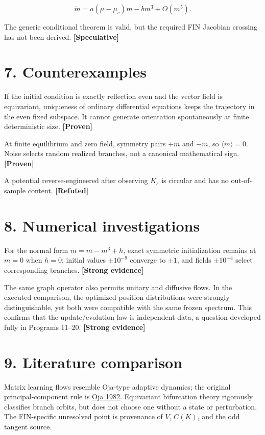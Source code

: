 \documentclass[11pt,a4paper,openany]{report}
\newcommand{\statusProven}{\textcolor{fingreen}{[Proven]}}
\newcommand{\statusStrong}{\textcolor{finblue}{[Strong evidence]}}
\newcommand{\statusSpeculative}{\textcolor{finorange}{[Speculative]}}
\newcommand{\statusRefuted}{\textcolor{finred}{[Refuted]}}
\begin{document}
\[
\dot m=a(\mu-\mu_c)m-bm^3+O(m^5).
\]

The generic conditional theorem is valid, but the required FIN Jacobian crossing has not been derived. \textbf{\statusSpeculative{}}

\section{7. Counterexamples}

If the initial condition is exactly reflection even and the vector field is equivariant, uniqueness of ordinary differential equations keeps the trajectory in the even fixed subspace. It cannot generate orientation spontaneously at finite deterministic size. \textbf{\statusProven{}}

At finite equilibrium and zero field, symmetry pairs \(+m\) and \(-m\), so \(\langle m\rangle=0\). Noise selects random realized branches, not a canonical mathematical sign. \textbf{\statusProven{}}

A potential reverse-engineered after observing \(K_s\) is circular and has no out-of-sample content. \textbf{\statusRefuted{}}

\section{8. Numerical investigations}

For the normal form \(\dot m=m-m^3+h\), exact symmetric initialization remains at \(m=0\) when \(h=0\); initial values \(\pm10^{-9}\) converge to \(\pm1\), and fields \(\pm10^{-4}\) select corresponding branches. \textbf{\statusStrong{}}

The same graph operator also permits unitary and diffusive flows. In the executed comparison, the optimized position distributions were strongly distinguishable, yet both were compatible with the same frozen spectrum. This confirms that the update/\allowbreak{}evolution law is independent data, a question developed fully in Programs 11–20. \textbf{\statusStrong{}}

\section{9. Literature comparison}

Matrix learning flows resemble Oja-type adaptive dynamics; the original principal-component rule is \href{https://doi.org/10.1007/BF00275687}{Oja 1982}. Equivariant bifurcation theory rigorously classifies branch orbits, but does not choose one without a state or perturbation. The FIN-specific unresolved point is provenance of \(V\), \(C(K)\), and the odd tangent source.
\end{document}
